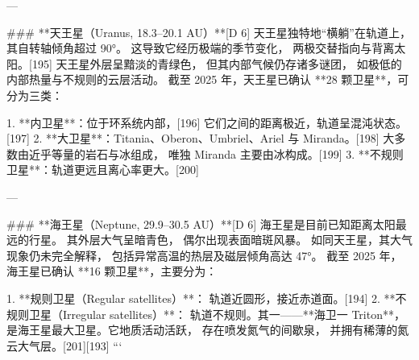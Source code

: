 ---

### **天王星（Uranus, 18.3–20.1 AU）**[D 6]  
天王星独特地“横躺”在轨道上，其自转轴倾角超过 90°。  
这导致它经历极端的季节变化，  
两极交替指向与背离太阳。[195]  
天王星外层呈黯淡的青绿色，  
但其内部气候仍存诸多谜团，  
如极低的内部热量与不规则的云层活动。  
截至 2025 年，天王星已确认 **28 颗卫星**，可分为三类：  

1. **内卫星**：位于环系统内部，[196]  
   它们之间的距离极近，轨道呈混沌状态。[197]  
2. **大卫星**：Titania、Oberon、Umbriel、Ariel 与 Miranda。[198]  
   大多数由近乎等量的岩石与冰组成，  
   唯独 Miranda 主要由冰构成。[199]  
3. **不规则卫星**：轨道更远且离心率更大。[200]  

---

### **海王星（Neptune, 29.9–30.5 AU）**[D 6]  
海王星是目前已知距离太阳最远的行星。  
其外层大气呈暗青色，  
偶尔出现表面暗斑风暴。  
如同天王星，其大气现象仍未完全解释，  
包括异常高温的热层及磁层倾角高达 47°。  
截至 2025 年，海王星已确认 **16 颗卫星**，主要分为：  

1. **规则卫星（Regular satellites）**：  
   轨道近圆形，接近赤道面。[194]  
2. **不规则卫星（Irregular satellites）**：  
   轨道不规则。其一——**海卫一 Triton**，  
   是海王星最大卫星。它地质活动活跃，  
   存在喷发氮气的间歇泉，  
   并拥有稀薄的氮云大气层。[201][193]
```




